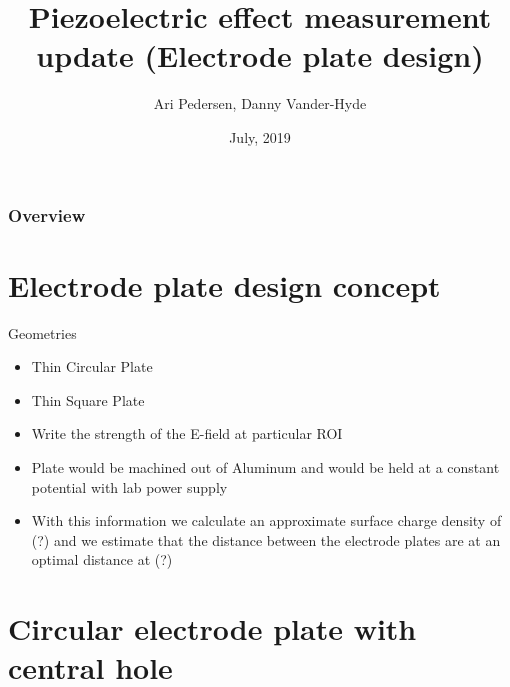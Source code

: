 \documentclass{beamer}
\title[Short title]{Piezoelectric effect measurement update (Electrode plate design)} %
\author{Ari Pedersen, Danny Vander-Hyde} %
\institute[Syracuse University] %
{
Syracuse University\\ %
\medskip
}
\date{July, 2019} %
\begin{document}
\begin{frame}
\titlepage %
\end{frame}

\begin{frame}
\frametitle{Overview} %
\tableofcontents %
\end{frame}


\section{Electrode plate design concept}
\begin{frame}{Geometries}
\begin{itemize}
\item Thin Circular Plate
\item Thin Square Plate
\item Write the strength of the E-field at particular ROI
\item Plate would be machined out of Aluminum and would be held at a constant potential with lab power supply
\item With this information we calculate an approximate surface charge density of (?) and we estimate that the distance between the electrode plates are at an optimal distance at (?)
\end{itemize}
\end{frame}

\section{Circular electrode plate with central hole}
\end{document}
